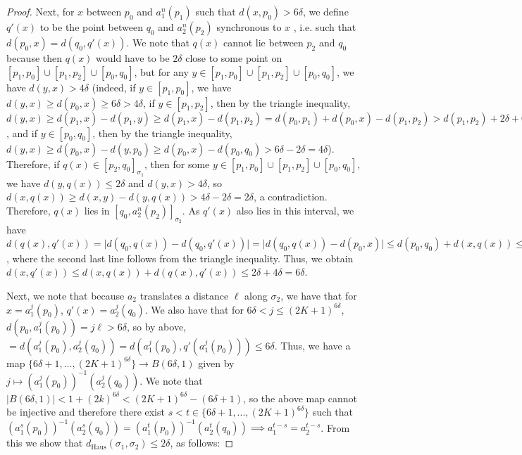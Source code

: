 \documentclass[12pt]{article}
\newcommand{\vs}{\vskip10pt}
\begin{document}
\begin{proof}
		\vs 
		
		Next, for $x$ between $p_0$ and $a_1^n (p_1)$ such that $d(x, p_0) > 6 \delta$, we define $q'(x)$ to be the point between $q_0$ and $a_2^n (p_2)$ synchronous to $x$ , i.e. such that $d(p_0, x) = d(q_0, q'(x))$. We note that $q(x)$ cannot lie between $p_2$ and $q_0$ because then $q(x)$ would have to be $2\delta$ close to some point on $[p_1,p_0] \cup [p_1, p_2] \cup [p_0, q_0]$, but for any $y \in [p_1,p_0] \cup [p_1, p_2] \cup [p_0, q_0]$, we have $d(y, x) > 4 \delta$ (indeed, if $y \in [p_1, p_0]$, we have $d(y,x) \geq d(p_0, x) \geq 6 \delta > 4 \delta$, if $y \in [p_1, p_2]$, then by the triangle inequality, $d(y,x) \geq d(p_1, x) - d(p_1, y) \geq d(p_1, x) - d(p_1, p_2) = d(p_0, p_1) + d(p_0, x) - d(p_1, p_2) > d(p_1, p_2) + 2 \delta + 6 \delta - d(p_1, p_2) = 8 \delta$, and if $y \in [p_0, q_0]$, then by the triangle inequality, $d(y,x) \geq d(p_0, x) - d(y, p_0) \geq d(p_0, x) - d(p_0, q_0) > 6 \delta - 2 \delta = 4 \delta$). Therefore, if $q(x) \in [p_2, q_0]_{\sigma_1}$, then for some $y \in [p_1,p_0] \cup [p_1, p_2] \cup [p_0, q_0]$, we have $d(y, q(x)) \leq 2 \delta$ and $d(y, x) > 4 \delta$, so $d(x, q(x)) \geq d(x, y) - d(y, q(x)) > 4 \delta - 2 \delta = 2 \delta$, a contradiction. Therefore, $q(x)$ lies in $[q_0, a_2^n (p_2)]_{\sigma_2}$. As $q'(x)$ also lies in this interval, we have $d(q(x), q'(x)) = \vert d(q_0, q(x)) - d(q_0, q'(x)) \vert = \vert d(q_0, q(x)) - d(p_0, x) \vert \leq d(p_0, q_0) + d(x, q(x)) \leq 4 \delta$, where the second last line follows from the triangle inequality. Thus, we obtain $d(x, q'(x)) \leq d(x, q(x)) + d(q(x), q'(x)) \leq 2 \delta + 4\delta = 6 \delta$. 
		
		\vs 
		
		Next, we note that because $a_2$ translates a distance $\ell$ along $\sigma_2$, we have that for $x = a_1^j (p_0)$, $q'(x) = a_2^j (q_0)$. We also have that for $6\delta < j \leq (2K+1)^{6\delta}$, $d(p_0, a_1^j (p_0)) = j \ell > 6 \delta$, so by above, $= d(a_1^j (p_0), a_2^j (q_0)) = d(a_1^j (p_0), q'(a_1^j (p_0))) \leq 6 \delta$. Thus, we have a map $\{6 \delta + 1, ..., (2K+1)^{6\delta}\} \rightarrow B(6 \delta, 1)$ given by $j \mapsto (a_1^j (p_0))^{-1}(a_2^j(q_0))$. We note that $\vert B(6 \delta, 1) \vert < 1 + (2k)^{6 \delta} < (2K+1)^{6 \delta} - (6 \delta + 1)$, so the above map cannot be injective and therefore there exist $s < t \in \{6 \delta + 1, ..., (2K+1)^{6\delta}\}$ such that $(a_1^s (p_0))^{-1}(a_2^s(q_0)) = (a_1^t (p_0))^{-1}(a_2^t(q_0)) \implies a_1^{t-s} = a_2^{t-s}$. From this we show that $d_{\text{Haus}}(\sigma_1, \sigma_2) \leq 2 \delta$, as follows: 
		

\end{proof}
\end{document}

